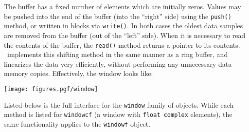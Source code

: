 The buffer has a fixed number of elements which are initially zeros.
Values may be pushed into the end of the buffer (into the ``right'' side)
using the {\tt push()} method, or written in blocks via {\tt write()}.
In both cases the oldest data samples are removed from the buffer (out of the
``left'' side).
When it is necessary to read the contents of the buffer, the {\tt read()}
method returns a pointer to its contents.
\liquid\ implements this shifting method in the same manner as a ring buffer,
and linearizes the data very efficiently, without performing any unnecessary
data memory copies.
Effectively, the window looks like:
%
\begin{centering}
\texttt{[image: figures.pgf/window]}
\end{centering}
%
Listed below is the full interface for the {\tt window} family of
objects.
While each method is listed for {\tt windowcf}
(a window with {\tt float complex} elements),
the same functionality applies to the {\tt windowf} object.
%
